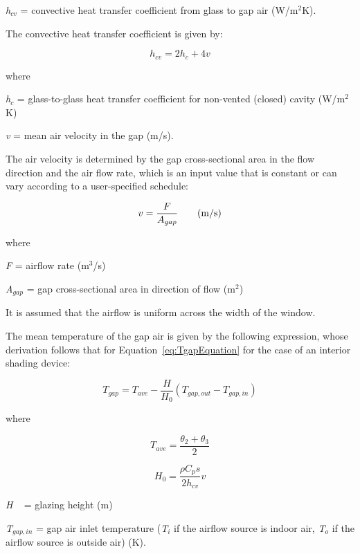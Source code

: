 \emph{h\(_{cv}\)} = convective heat transfer coefficient from glass to gap air (W/m\(^{2}\)K).

The convective heat transfer coefficient is given by:

\begin{equation}
{h_{cv}} = 2{h_c} + 4v
\end{equation}

where

\emph{h\(_{c}\)} = glass-to-glass heat transfer coefficient for non-vented (closed) cavity (W/m\(^{2}\)K)

\emph{v} = mean air velocity in the gap (m/s).

The air velocity is determined by the gap cross-sectional area in the flow direction and the air flow rate, which is an input value that is constant or can vary according to a user-specified schedule:

\begin{equation}
v = \frac{F}{{{A_{gap}}}}{\rm{~~~~~~(m/s)}}
\end{equation}

where

\emph{F} = airflow rate (m\(^{3}\)/s)

\emph{A\(_{gap}\)} = gap cross-sectional area in direction of flow (m\(^{2}\))

It is assumed that the airflow is uniform across the width of the window.

The mean temperature of the gap air is given by the following expression, whose derivation follows that for Equation~\ref{eq:TgapEquation} for the case of an interior shading device:

\begin{equation}
{T_{gap}} = {T_{ave}} - \frac{H}{{{H_0}}}({T_{gap,out}} - {T_{gap,in}})
\end{equation}

where

\begin{equation}
{T_{ave}} = \frac{{{\theta_2} + {\theta_3}}}{2}
\end{equation}

\begin{equation}
{H_0} = \frac{{\rho {C_p}s}}{{2{h_{cv}}}}v
\end{equation}

\emph{H} ~ = glazing height (m)

\emph{T\(_{gap,in}\)} = gap air inlet temperature (\emph{T\(_{i}\)} if the airflow source is indoor air, \emph{T\(_{o}\)} if the airflow source is outside air) (K).

